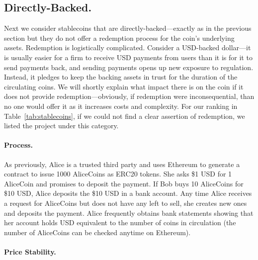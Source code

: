 
\subsection{Directly-Backed.}

Next we consider stablecoins that are directly-backed---exactly as in the previous section but they do not offer a redemption process for the coin's underlying assets. Redemption is logistically complicated. Consider a USD-backed dollar---it is usually easier for a firm to receive USD payments from users than it is for it to send payments back, and sending payments opens up new exposure to regulation. Instead, it pledges to keep the backing assets in trust for the duration of the circulating coins. We will shortly explain what impact there is on the coin if it does not provide redemption---obviously, if redemption were inconsequential, than no one would offer it as it increases costs and complexity. For our ranking in Table~\ref{tab:stablecoins}, if we could not find a clear assertion of redemption, we listed the project under this category.

\paragraph{Process.} As previously, Alice is a trusted third party and uses Ethereum to generate a contract to issue 1000 AliceCoins as ERC20 tokens. She asks \$1 USD for 1 AliceCoin and promises to deposit the payment. If Bob buys 10 AliceCoins for \$10 USD, Alice deposits the \$10 USD in a bank account. Any time Alice receives a request for AliceCoins but does not have any left to sell, she creates new ones and deposits the payment. Alice frequently obtains bank statements showing that her account holds USD equivalent to the number of coins in circulation (the number of AliceCoins can be checked anytime on Ethereum).

\paragraph{Price Stability.}

